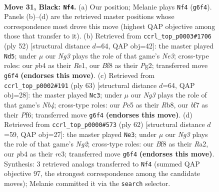 \documentclass[11pt]{article}
\begin{document}
\clearpage

\begin{figure}[p]\centering
\begin{subfigure}{0.46\textwidth}\centering
\resizebox{\linewidth}{!}{%
\newchessgame
\chessboard[
  setfen={rk3b1r/5B2/p4Pn1/2P1p2p/1P2R3/8/8/R1B1K3 b Q - 1 31},
  showmover=false,
  pgfstyle=straightmove, color=movearrow, markmove={g6-f4}
]}
\caption{}
\end{subfigure}\hfill
\begin{subfigure}{0.46\textwidth}\centering
\resizebox{\linewidth}{!}{%
\newchessgame
\chessboard[
  setfen={1r4r1/3k1p1p/B2pb3/6b1/8/1P2N3/2P3PP/1K1RR3 w - - 1 27},
  showmover=false,
  pgfstyle=straightmove, color=movearrow, markmove={e3-d5}
]}
\caption{}
\end{subfigure}
\\[4pt]
\begin{subfigure}{0.46\textwidth}\centering
\resizebox{\linewidth}{!}{%
\newchessgame
\chessboard[
  setfen={1r1r2k1/7p/B2p1pp1/Pn4B1/8/5P1P/1bR2P2/3R2K1 b - - 0 32},
  showmover=false,
  pgfstyle=straightmove, color=movearrow, markmove={b5-c3}
]}
\caption{}
\end{subfigure}\hfill
\begin{subfigure}{0.46\textwidth}\centering
\resizebox{\linewidth}{!}{%
\newchessgame
\chessboard[
  setfen={4r1k1/1p5p/2b5/6p1/8/2r3P1/R3PPN1/4R1K1 w - - 0 32},
  showmover=false,
  pgfstyle=straightmove, color=movearrow, markmove={g2-e3}
]}
\caption{}
\end{subfigure}
\caption{\textbf{Move 31, Black: \texttt{Nf4}.} (a) Our position; Melanie plays \texttt{Nf4} (\texttt{g6f4}). Panels (b)--(d) are the retrieved master positions whose correspondence most drove this move (highest QAP objective among those that transfer to it). (b) Retrieved from \texttt{ccrl\_top\_p0003\#1706} (ply 52) [structural distance $d$=64, QAP obj=42]: the master played \texttt{Nd5}; under $\mu$ our \emph{Ng3} plays the role of that game's \emph{Ne3}; cross-type roles: our \emph{p}b4 as their \emph{R}e1, our \emph{B}f8 as their \emph{P}g2; transferred move \texttt{g6f4} \textbf{(endorses this move)}. (c) Retrieved from \texttt{ccrl\_top\_p0002\#191} (ply 63) [structural distance $d$=64, QAP obj=28]: the master played \texttt{Nc3}; under $\mu$ our \emph{Ng3} plays the role of that game's \emph{Nb4}; cross-type roles: our \emph{P}e5 as their \emph{R}b8, our \emph{b}f7 as their \emph{P}f6; transferred move \texttt{g6f4} \textbf{(endorses this move)}. (d) Retrieved from \texttt{ccrl\_top\_p0000\#573} (ply 62) [structural distance $d$=59, QAP obj=27]: the master played \texttt{Ne3}; under $\mu$ our \emph{Ng3} plays the role of that game's \emph{Ng2}; cross-type roles: our \emph{B}f8 as their \emph{R}a2, our \emph{p}b4 as their \emph{r}c3; transferred move \texttt{g6f4} \textbf{(endorses this move)}. Synthesis: 3 retrieved analogs transferred to \texttt{Nf4} (summed QAP objective 97, the strongest correspondence among the candidate moves); Melanie committed it via the \texttt{search} selector.}
\label{fig:thought-m61}
\end{figure}
\end{document}
